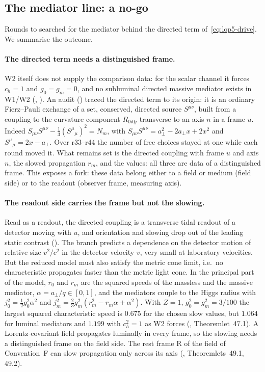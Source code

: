 \subsection{The mediator line: a no-go}
\label{sec:lop5-mediator}

Rounds  to  searched for the mediator behind the directed term of~\eqref{eq:lop5-drive}.  We summarise the outcome.

\paragraph{The directed term needs a distinguished frame.}
W2 itself does not supply the comparison data: for the scalar channel it forces $c_h=1$ and $g_0=g_m=0$, and no subluminal directed massive
mediator exists in W1/W2 (, ).  An audit () traced the directed term to its origin: it is an ordinary Fierz--Pauli
exchange of a set, conserved, directed source $S^{\mu\nu}$, built from a coupling to the curvature component $R_{0i0j}$ transverse to an axis $n$
in a frame $u$.  Indeed $S_{\mu\nu}S^{\mu\nu}-\tfrac13(S^\mu{}_\mu)^2=N_m$, with $S_{\mu\nu}S^{\mu\nu}=a_\perp^2-2a_\perp x+2x^2$ and
$S^\mu{}_\mu=2x-a_\perp$.  Over r33--r44 the number of free choices stayed at one while each round moved it.  What remains set is the directed
coupling with frame $u$ and axis $n$, the slowed propagation $r_m$, and the values: all three are data of a distinguished frame.  This exposes a
fork: these data belong either to a field or medium (field side) or to the readout (observer frame, measuring axis).

\paragraph{The readout side carries the frame but not the slowing.}
Read as a readout, the directed coupling is a transverse tidal readout of a detector moving with $u$, and orientation and slowing drop out of the
leading static contrast ().  The branch predicts a dependence on the detector motion of relative size $v^2/c^2$ in the detector velocity $v$, very small at
laboratory velocities.  But the reduced model must also satisfy the metric cone limit, i.e.\ no characteristic propagates faster than the
metric light cone.  In the principal part of the model, $r_0$ and $r_m$ are the squared speeds of the massless and the massive mediator,
$\alpha=a_\perp/q\in[0,1]$, and the mediators couple to the Higgs radius with $j_0^2=\tfrac12g_0^2\alpha^2$ and
$j_m^2=\tfrac23g_m^2(r_m^2-r_m\alpha+\alpha^2)$.  With $Z=1$, $g_0^2=g_m^2=3/100$ the largest squared characteristic speed is $0.675$ for the chosen slow values, but $1.064$
for luminal mediators and $1.199$ with $c_h^2=1$ as W2 forces (, Theoremlet~47.1).  A Lorentz-covariant field propagates luminally in
every frame, so the slowing needs a distinguished frame on the field side.  The rest frame R of the field of Convention~F can slow propagation only
across its axis (, Theoremlets~49.1, 49.2).

